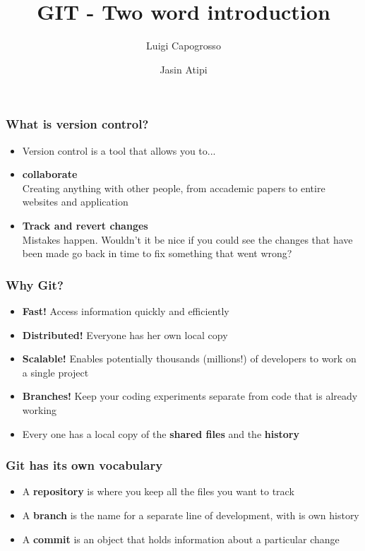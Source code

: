 \documentclass{beamer}
\title{GIT - Two word introduction}
\author{Luigi Capogrosso \and Jasin Atipi}
\begin{document}
\begin{frame}
\maketitle
\end{frame}

\begin{frame}
\frametitle{What is version control?}
\begin{itemize}
\item <1-> Version control is a tool that allows you to...
\item <2-> \textbf{collaborate} \\
Creating anything with other people, from accademic papers to entire websites and 					application
\item <3-> \textbf{Track and revert changes} \\
Mistakes happen. Wouldn't it be nice if you could see the changes that have been made go 			back in time to fix something that went wrong?
\end{itemize}
\end{frame}

\begin{frame}
\frametitle{Why Git?}
\begin{itemize}
\item<1-> \textbf{Fast!} Access information quickly and efficiently
\item<2-> \textbf{Distributed!} Everyone has her own local copy
\item<3-> \textbf{Scalable!} Enables potentially thousands (millions!) of developers to work 			on a single project
\item<4-> \textbf{Branches!} Keep your coding experiments separate from code that is already  		working
\item<5-> Every one has a local copy of the \textbf{shared files} and the \textbf{history}
\end{itemize}
\end{frame}

\begin{frame}
\frametitle{Git has its own vocabulary}
\begin{itemize}
\item <1-> A \textbf{repository} is where you keep all the files you want to track
\item <2-> A \textbf{branch} is the name for a separate line of development, with is own 				history
\item <3-> A \textbf{commit} is an object that holds information about a particular change
\end{itemize}
\end{frame}
\end{document}
